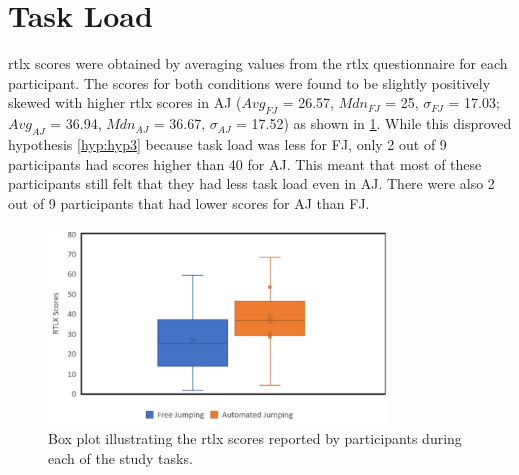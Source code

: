 \section{Task Load}
\label{subsection EUS: Task Load}
\acrshort{rtlx} scores were obtained by averaging values from the \acrshort{rtlx} questionnaire for each participant. The scores for both conditions were found to be slightly positively skewed with higher \acrshort{rtlx} scores in AJ ($Avg_{FJ}$ = 26.57, $Mdn_{FJ}$ = 25, $\sigma_{FJ}$ = 17.03; $Avg_{AJ}$ = 36.94, $Mdn_{AJ}$ = 36.67, $\sigma_{AJ}$ = 17.52) as shown in \ref{fig:task-load}. While this disproved hypothesis \ref{hyp:hyp3} because task load was less for FJ, only 2 out of 9 participants had scores higher than 40 for AJ. This meant that most of these participants still felt that they had less task load even in AJ. There were also 2 out of 9 participants that had lower scores for AJ than FJ.  
\begin{figure}[]
	\centering
	\includegraphics[width=0.8\textwidth]{images/task-load.pdf}
	\caption{Box plot illustrating the \acrshort{rtlx} scores reported by participants during each of the study tasks.}
	\label{fig:task-load}
\end{figure}
